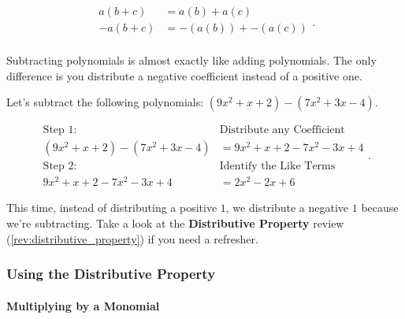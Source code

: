 \begin{review}
  \label{rev:distributive_property}

  \begin{equation}
    \label{eqt:distributive_property}
    \begin{split}
      a(b + c) &= a(b) + a(c) \\
      -a(b + c) &= -(a(b)) + -(a(c)) \\
    \end{split}
  .\end{equation}
\end{review}

Subtracting polynomials is almost exactly like adding polynomials. The only
difference is you distribute a negative coefficient instead of a positive one.

\begin{example}
  \label{exm:subtracting_polynomials}
  Let's subtract the following polynomials:
  $(9x^{2} + x + 2) - (7x^{2} + 3x - 4)$.

  \begin{equation}
    \label{eqt:subtracting_polynomials}
    \begin{split}
      \textrm{Step $1$:} \quad &\textrm{Distribute any Coefficient} \\
      (9x^{2} + x + 2) - (7x^{2} + 3x - 4) &= 9x^{2} + x + 2 - 7x^{2} - 3x + 4 \\
      \textrm{Step $2$:} \quad &\textrm{Identify the Like Terms} \\
      9x^{2} + x + 2 - 7x^{2} - 3x + 4 &= \boxed{2x^{2} - 2x + 6}
    \end{split}
  .\end{equation}

  This time, instead of distributing a positive $1$, we distribute a negative
  $1$ because we're subtracting. Take a look at the \textbf{Distributive
  Property} review (\ref{rev:distributive_property}) if you need a refresher.
\end{example}


\subsubsection{Using the Distributive Property}
\label{sub_sub_sec:using_the_distributive_property}

\paragraph{Multiplying by a Monomial}
\label{par:multiplying_by_a_monomial}

